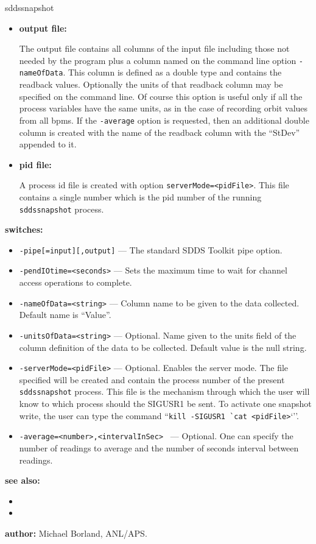 \begin{sddsprog}{sddssnapshot}
\begin{itemize}
  \item \textbf{output file:}\par
The output file contains all columns of the input file including those
not needed by the program plus a column named on the command line option {\tt -nameOfData}.
This column is defined as a double type and contains the readback values.
Optionally the units of that readback column may be specified on the command line.
Of course this option is useful only if all the process variables have the same units, as in
the case of recording orbit values from all bpms.
If the {\tt -average} option is requested, then an additional double column is created with the name
of the readback column with the ``StDev'' appended to it.

  \item \textbf{pid file:}\par
A process id file is created with option {\verb+serverMode=<pidFile>+}. This file contains a single
number which is the pid number of the running {\verb+sddssnapshot+} process.
\end{itemize}
\item \textbf{switches:}
\begin{itemize}
  \item {\tt -pipe[=input][,output]} --- The standard SDDS Toolkit pipe option.
  \item {\tt -pendIOtime=<seconds>} --- Sets the maximum time to wait for channel access operations to complete.
  \item {\tt -nameOfData=<string>} --- Column name to be given to the data collected. Default name is ``Value''.
  \item {\tt -unitsOfData=<string>} --- Optional. Name given to the units field of the column definition
                        of the data to be collected. Default value is the null string.
  \item {\tt -serverMode=<pidFile>} --- Optional. Enables the server mode. The file specified will be created and contain
                the process number of the present \verb+sddssnapshot+ process. This file is the mechanism
                through which the user will know to which process should the SIGUSR1 be sent.
                To activate one snapshot write, the user can type
                the command ``\verb+kill -SIGUSR1 `cat <pidFile>+`''.
  \item {\tt -average=<number>,<intervalInSec> } --- Optional. One can specify the number of readings to
                average and the number of seconds interval between readings.
\end{itemize}

\item \textbf{see also:}
\begin{itemize}
  \item {}
  \item {}
\end{itemize}
\item \textbf{author:} Michael Borland, ANL/APS.
\end{sddsprog}
